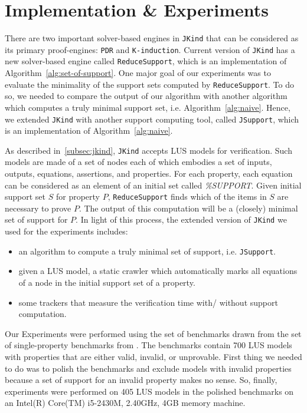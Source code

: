 \section{Implementation \& Experiments}
\label{sec:exprm}
There are two important solver-based engines in \texttt{JKind} that can be considered as its primary proof-engines: \texttt{PDR} and \texttt{K-induction}. Current version of \texttt{JKind} has a new solver-based engine called \texttt{ReduceSupport},
which is an implementation of Algorithm~\ref{alg:set-of-support}.
One major goal of our experiments was to evaluate the minimality of the support sets computed by \texttt{ReduceSupport}.
To do so, we needed to compare the output of our algorithm with another algorithm
which computes a truly minimal support set, i.e. Algorithm~\ref{alg:naive}. Hence, we extended \texttt{JKind}
with another support computing tool, called \texttt{JSupport}, which is an implementation of Algorithm~\ref{alg:naive}.

As described in~\ref{subsec:jkind}, \texttt{JKind} accepts LUS models for verification.
Such models are made of a set of nodes each of which embodies a set of inputs, outputs, equations, assertions, and properties. For each property, each equation can be considered as an element of an initial set called \textit{\%SUPPORT}. Given initial support set $S$ for property $P$, \texttt{ReduceSupport} finds which of the items in $S$ are necessary to prove $P$. The output of this computation will be a (closely) minimal set of support for $P$. In light of this process, the extended version of \texttt{JKind} we used for the experiments includes:

\begin{itemize}
    \item an algorithm to compute a truly minimal set of support, i.e. \texttt{JSupport}.
    \item given a LUS model, a static crawler which automatically marks all equations of a node in the initial support set of a property.
    \item some trackers that measure the verification time with/ without support computation.
\end{itemize}

Our Experiments were performed using the set of benchmarks drawn from the set of single-property benchmarks from \cite{benchmarks}. The benchmarks contain 700 LUS models with properties that are either valid, invalid, or unprovable. First thing we needed to do was to polish the benchmarks and exclude models with invalid properties because a set of support for an invalid property makes no sense. So, finally, experiments were performed on 405 LUS models in the polished benchmarks on an Intel(R) Core(TM) i5-2430M, 2.40GHz, 4GB memory machine.


